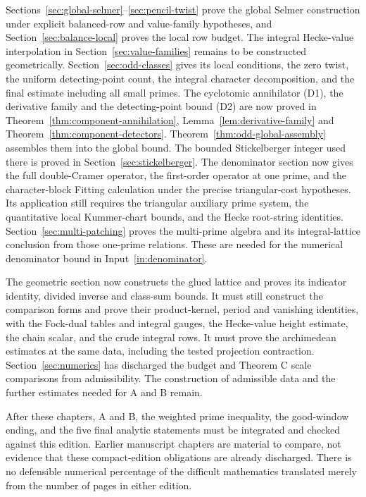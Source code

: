\documentclass[11pt,a4paper]{article}
\theoremstyle{definition}
\begin{document}
Sections~\ref{sec:global-selmer}--\ref{sec:pencil-twist} prove the
global Selmer construction under explicit balanced-row and value-family
hypotheses, and Section~\ref{sec:balance-local} proves the local row budget.
The integral Hecke-value interpolation in Section~\ref{sec:value-families}
remains to be constructed geometrically. Section~\ref{sec:odd-classes} gives its local conditions, the zero twist,
the uniform detecting-point count, the integral character decomposition,
and the final estimate including all small primes. The cyclotomic annihilator (D1), the derivative family and the
detecting-point bound (D2) are now proved in
Theorem~\ref{thm:component-annihilation},
Lemma~\ref{lem:derivative-family} and
Theorem~\ref{thm:component-detectors}.
Theorem~\ref{thm:odd-global-assembly} assembles them into the global bound. The bounded
Stickelberger integer used there is proved in Section~\ref{sec:stickelberger}.
The denominator section now gives the full double-Cramer operator,
the first-order operator at one prime, and the character-block Fitting
calculation under the precise triangular-cost hypotheses. Its application still requires
the triangular auxiliary prime system, the quantitative local
Kummer-chart bounds, and the Hecke
root-string identities. Section~\ref{sec:multi-patching} proves the
multi-prime algebra and its integral-lattice conclusion from those
one-prime relations. These are needed for
the numerical denominator bound in Input~\ref{in:denominator}.

The geometric section now constructs the glued lattice and proves its
indicator identity, divided inverse and class-sum bounds. It must still
construct the comparison forms and prove their product-kernel,
period and vanishing identities, with the Fock-dual tables and integral
gauges, the Hecke-value height estimate,
the chain scalar, and the crude integral rows. It must prove the
archimedean estimates at the same data, including the tested projection
contraction. Section~\ref{sec:numerics} has discharged the budget and
Theorem C scale comparisons from admissibility. The construction of
admissible data and the further estimates needed for A and B remain.

After these chapters, A and B, the weighted prime inequality, the
good-window ending, and the five final analytic statements must be
integrated and checked against this edition.
Earlier manuscript chapters are material to compare, not evidence that
these compact-edition obligations are already discharged.
There is no defensible numerical percentage of the difficult mathematics
translated merely from the number of pages in either edition.
\end{document}
